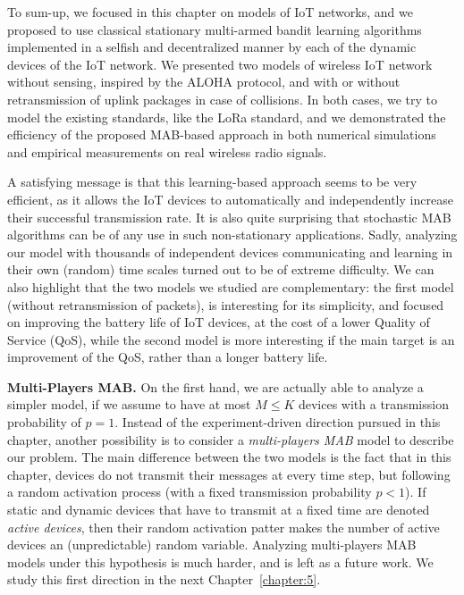 
To sum-up, we focused in this chapter on models of IoT networks, and we proposed to use classical stationary multi-armed bandit learning algorithms implemented in a selfish and decentralized manner by each of the dynamic devices of the IoT network.
We presented two models of wireless IoT network without sensing, inspired by the ALOHA protocol, and with or without retransmission of uplink packages in case of collisions.
In both cases, we try to model the existing standards, like the LoRa standard, and we demonstrated the efficiency of the proposed MAB-based approach in both numerical simulations and empirical measurements on real wireless radio signals.

A satisfying message is that this learning-based approach seems to be very efficient, as it allows the IoT devices to automatically and independently increase their successful transmission rate.
It is also quite surprising that stochastic MAB algorithms can be of any use in such non-stationary applications.
Sadly, analyzing our model with thousands of independent devices communicating and learning in their own (random) time scales turned out to be of extreme difficulty.
%
We can also highlight that the two models we studied are complementary:
the first model (without retransmission of packets), is interesting for its simplicity, and focused on improving the battery life of IoT devices, at the cost of a lower Quality of Service (QoS),
%
while the second model is more interesting if the main target is an improvement of the QoS, rather than a longer battery life.


\textbf{Multi-Players MAB.}
%
On the first hand, we are actually able to analyze a simpler model, if we assume to have at most $M \leq K$ devices with a transmission probability of $p=1$.
Instead of the experiment-driven direction pursued in this chapter, another possibility is to consider a \emph{multi-players MAB} model to describe our problem.
%
The main difference between the two models is the fact that in this chapter, devices do not transmit their messages at every time step, but following a random activation process (with a fixed transmission probability $p < 1$).
If static and dynamic devices that have to transmit at a fixed time are denoted \emph{active devices},
then their random activation patter makes the number of active devices an (unpredictable) random variable.
Analyzing multi-players MAB models under this hypothesis is much harder, and is left as a future work.
%
We study this first direction in the next Chapter~\ref{chapter:5}.

